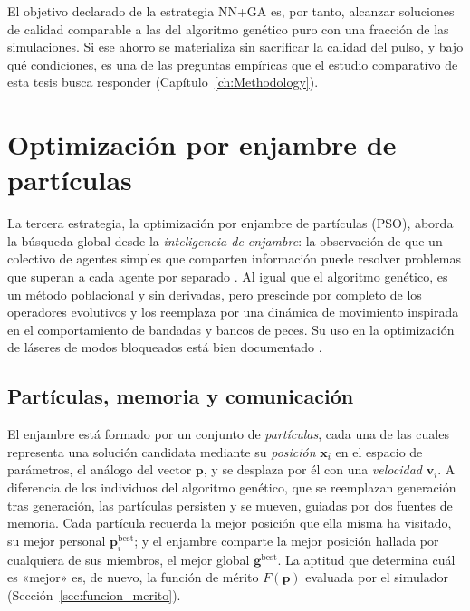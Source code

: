 El objetivo declarado de la estrategia NN+GA es, por tanto, alcanzar soluciones de
calidad comparable a las del algoritmo genético puro con una fracción de las
simulaciones. Si ese ahorro se materializa sin sacrificar la calidad del pulso, y
bajo qué condiciones, es una de las preguntas empíricas que el estudio comparativo
de esta tesis busca responder (Capítulo~\ref{ch:Methodology}).



\section{Optimización por enjambre de partículas}
\label{sec:pso}

La tercera estrategia, la optimización por enjambre de partículas (PSO), aborda la
búsqueda global desde la \emph{inteligencia de enjambre}: la observación de que un
colectivo de agentes simples que comparten información puede resolver problemas que
superan a cada agente por separado \cite{Kennedy1995}. Al igual que el algoritmo
genético, es un método poblacional y sin derivadas, pero prescinde por completo de
los operadores evolutivos y los reemplaza por una dinámica de movimiento inspirada
en el comportamiento de bandadas y bancos de peces. Su uso en la optimización de
láseres de modos bloqueados está bien documentado
\cite{Kokhanovskiy2021,Nsoungui2026}.

\subsection{Partículas, memoria y comunicación}
\label{sec:pso_particulas}

El enjambre está formado por un conjunto de \emph{partículas}, cada una de las
cuales representa una solución candidata mediante su \emph{posición}
$\mathbf{x}_i$ en el espacio de parámetros, el análogo del vector $\mathbf{p}$, y se
desplaza por él con una \emph{velocidad} $\mathbf{v}_i$. A diferencia de los
individuos del algoritmo genético, que se reemplazan generación tras generación,
las partículas persisten y se mueven, guiadas por dos fuentes de memoria. Cada
partícula recuerda la mejor posición que ella misma ha visitado, su mejor personal
$\mathbf{p}_i^{\text{best}}$; y el enjambre comparte la mejor posición hallada por
cualquiera de sus miembros, el mejor global $\mathbf{g}^{\text{best}}$. La aptitud
que determina cuál es «mejor» es, de nuevo, la función de mérito
$F(\mathbf{p})$ evaluada por el simulador (Sección~\ref{sec:funcion_merito}).

